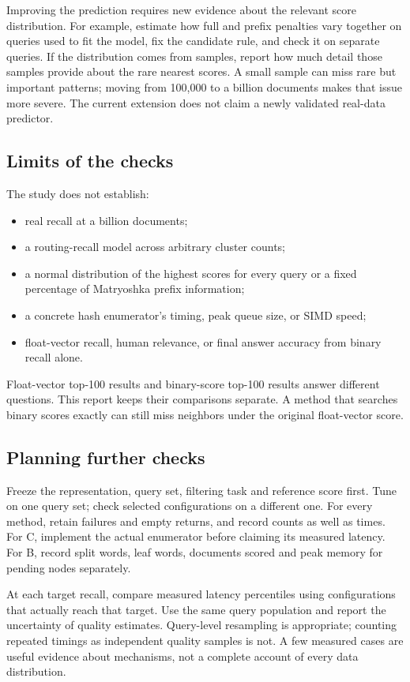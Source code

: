 Improving the prediction requires new evidence about the relevant score distribution. For
example, estimate how full and prefix penalties vary together on queries used to fit the model, fix the
candidate rule, and check it on separate queries. If the distribution comes from samples, report
how much detail those samples provide about the rare nearest scores. A small sample can miss rare but
important patterns; moving from 100,000 to a billion documents makes that issue more severe.
The current extension does not claim a newly validated real-data predictor.

\subsection{Limits of the checks}
The study does not establish:
\begin{itemize}
\item real recall at a billion documents;
\item a routing-recall model across arbitrary cluster counts;
\item a normal distribution of the highest scores for every query or a fixed percentage of Matryoshka prefix information;
\item a concrete hash enumerator's timing, peak queue size, or SIMD speed;
\item float-vector recall, human relevance, or final answer accuracy from binary recall alone.
\end{itemize}
Float-vector top-100 results and binary-score top-100 results answer different questions.
This report keeps their comparisons separate. A method that searches binary scores exactly
can still miss neighbors under the original float-vector score.

\subsection{Planning further checks}
Freeze the representation, query set, filtering task and reference score first. Tune on one
query set; check selected configurations on a different one. For every method, retain failures
and empty returns, and record counts as well as times. For C, implement the actual enumerator
before claiming its measured latency. For B, record split words, leaf words, documents scored
and peak memory for pending nodes separately.

At each target recall, compare measured latency percentiles using configurations that actually
reach that target. Use the same query population and report the uncertainty of quality estimates.
Query-level resampling is appropriate; counting repeated timings as independent quality samples
is not. A few measured cases are useful evidence about mechanisms, not a complete account
of every data distribution.

